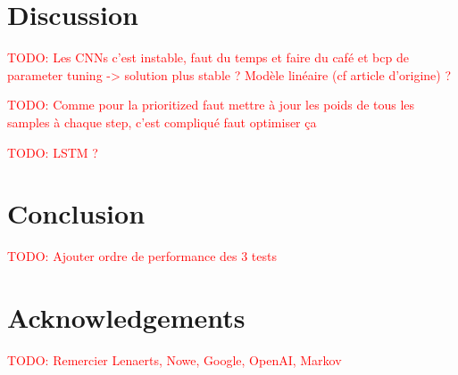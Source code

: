 \documentclass[letterpaper]{article}
\newcommand\todo[1]{\textcolor{red}{TODO: #1}}
\begin{document}
\section{Discussion}

\todo{Les CNNs c'est instable, faut du temps et faire du café et bcp de parameter tuning -> solution plus stable ? Modèle linéaire (cf article d'origine) ?}

\todo{Comme pour la prioritized faut mettre à jour les poids de tous les samples à chaque step, c'est compliqué faut optimiser ça}

\todo{LSTM ?}

\section{Conclusion}

	\todo{Ajouter ordre de performance des 3 tests}

\section{Acknowledgements}

  \todo{Remercier Lenaerts, Nowe, Google, OpenAI, Markov}

\newpage
\footnotesize


\end{document}
